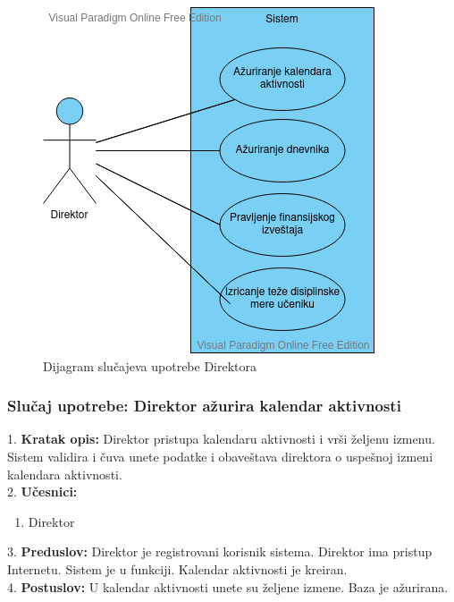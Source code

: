 \documentclass{article}
\begin{document}
\begin{figure} [!ht]
    \begin{center}
        \includegraphics[scale=0.6]{imgs/direktor_use_case.png}
    \end{center}
\caption{Dijagram slučajeva upotrebe Direktora}
\end{figure}

\newpage
\subsubsection{Slučaj upotrebe: Direktor ažurira kalendar aktivnosti}
1. \textbf{Kratak opis:} Direktor pristupa kalendaru aktivnosti i vrši željenu izmenu. Sistem validira i čuva unete podatke i obaveštava direktora o uspešnoj izmeni kalendara aktivnosti.\\

2. \textbf{Učesnici:}
\begin{enumerate} [label=(\alph*)]
\item Direktor
\end{enumerate} 

3. \textbf{Preduslov:} Direktor je registrovani korisnik sistema. Direktor ima pristup Internetu. Sistem je u funkciji. Kalendar aktivnosti je kreiran. \\

4. \textbf{Postuslov:} U kalendar aktivnosti unete su željene izmene. Baza je ažurirana. \\
\end{document}
